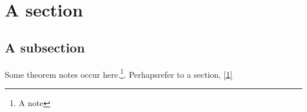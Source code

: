 \section{A section}
\subsection{A subsection}
\begin{theorem}
    Some theorem notes occur here.\footnote{A note}. Perhaps\footnotemark refer to a section, \cref{1}
\end{theorem}
